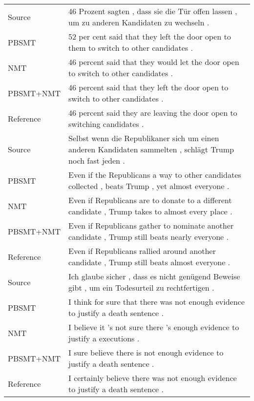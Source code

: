 \documentclass[11pt,a4paper]{article}
\begin{document}
{\begin{table*}[p]
{\begin{tabular}{ll}
        \midrule
    
        Source    & 46 Prozent sagten , dass sie die Tür offen lassen , um zu anderen Kandidaten zu wechseln . \\
        PBSMT     & 52 per cent said that they left the door open to them to switch to other candidates . \\
        NMT       & 46 percent said that they would let the door open to switch to other candidates . \\
        PBSMT+NMT & 46 percent said that they left the door open to switch to other candidates . \\
        Reference & 46 percent said they are leaving the door open to switching candidates . \\
    
        \midrule
    
        Source    & Selbst wenn die Republikaner sich um einen anderen Kandidaten sammelten , schlägt Trump noch fast jeden . \\
        PBSMT     & Even if the Republicans a way to other candidates collected , beats Trump , yet almost everyone . \\
        NMT       & Even if Republicans are to donate to a different candidate , Trump takes to almost every place . \\
        PBSMT+NMT & Even if Republicans gather to nominate another candidate , Trump still beats nearly everyone . \\
        Reference & Even if Republicans rallied around another candidate , Trump still beats almost everyone . \\
    
        \midrule
    
        Source    & Ich glaube sicher , dass es nicht genügend Beweise gibt , um ein Todesurteil zu rechtfertigen . \\
        PBSMT     & I think for sure that there was not enough evidence to justify a death sentence . \\
        NMT       & I believe it 's not sure there 's enough evidence to justify a executions . \\
        PBSMT+NMT & I sure believe there is not enough evidence to justify a death sentence . \\
        Reference & I certainly believe there was not enough evidence to justify a death sentence . \\
    
        \midrule
    

\end{tabular}}
\end{table*}}
\end{document}
